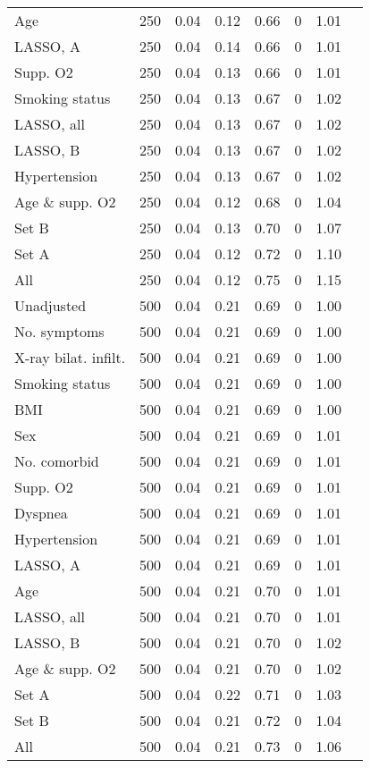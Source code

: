 \documentclass{article}
\begin{document}
{\begin{longtable}{lccccccc}
Age & 250 & 0.04 & 0.12 & 0.66 & 0 & 1.01\\
LASSO, A & 250 & 0.04 & 0.14 & 0.66 & 0 & 1.01\\
Supp. O2 & 250 & 0.04 & 0.13 & 0.66 & 0 & 1.01\\
Smoking status & 250 & 0.04 & 0.13 & 0.67 & 0 & 1.02\\
LASSO, all & 250 & 0.04 & 0.13 & 0.67 & 0 & 1.02\\
LASSO, B & 250 & 0.04 & 0.13 & 0.67 & 0 & 1.02\\
Hypertension & 250 & 0.04 & 0.13 & 0.67 & 0 & 1.02\\
Age \& supp. O2 & 250 & 0.04 & 0.12 & 0.68 & 0 & 1.04\\
Set B & 250 & 0.04 & 0.13 & 0.70 & 0 & 1.07\\
Set A & 250 & 0.04 & 0.12 & 0.72 & 0 & 1.10\\
All & 250 & 0.04 & 0.12 & 0.75 & 0 & 1.15\\ \midrule
Unadjusted & 500 & 0.04 & 0.21 & 0.69 & 0 & 1.00\\
No. symptoms & 500 & 0.04 & 0.21 & 0.69 & 0 & 1.00\\
X-ray bilat. infilt. & 500 & 0.04 & 0.21 & 0.69 & 0 & 1.00\\
Smoking status & 500 & 0.04 & 0.21 & 0.69 & 0 & 1.00\\
BMI & 500 & 0.04 & 0.21 & 0.69 & 0 & 1.00\\
Sex & 500 & 0.04 & 0.21 & 0.69 & 0 & 1.01\\
No. comorbid & 500 & 0.04 & 0.21 & 0.69 & 0 & 1.01\\
Supp. O2 & 500 & 0.04 & 0.21 & 0.69 & 0 & 1.01\\
Dyspnea & 500 & 0.04 & 0.21 & 0.69 & 0 & 1.01\\
Hypertension & 500 & 0.04 & 0.21 & 0.69 & 0 & 1.01\\
LASSO, A & 500 & 0.04 & 0.21 & 0.69 & 0 & 1.01\\
Age & 500 & 0.04 & 0.21 & 0.70 & 0 & 1.01\\
LASSO, all & 500 & 0.04 & 0.21 & 0.70 & 0 & 1.01\\
LASSO, B & 500 & 0.04 & 0.21 & 0.70 & 0 & 1.02\\
Age \& supp. O2 & 500 & 0.04 & 0.21 & 0.70 & 0 & 1.02\\
Set A & 500 & 0.04 & 0.22 & 0.71 & 0 & 1.03\\
Set B & 500 & 0.04 & 0.21 & 0.72 & 0 & 1.04\\
All & 500 & 0.04 & 0.21 & 0.73 & 0 & 1.06\\ \midrule

\end{longtable}}
\end{document}
